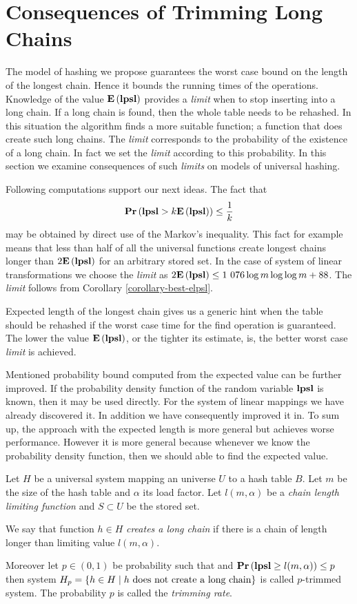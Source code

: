 \section{Consequences of Trimming Long Chains}
The model of hashing we propose guarantees the worst case bound on the length of the longest chain. Hence it bounds the running times of the operations. Knowledge of the value $\mathbf{E}\left(\mathbf{lpsl}\right)$ provides a \emph{limit} when to stop inserting into a long chain. If a long chain is found, then the whole table needs to be rehashed. In this situation the algorithm finds a more suitable function; a function that does create such long chains. The \emph{limit} corresponds to the probability of the existence of a long chain. In fact we set the \emph{limit} according to this probability. In this section we examine consequences of such \emph{limits} on models of universal hashing.

Following computations support our next ideas. The fact that \[ \mathbf{Pr}\left(\mathbf{lpsl} > k \mathbf{E}\left(\mathbf{lpsl}\right)\right) \leq \frac{1}{k} \] may be obtained by direct use of the Markov's inequality. This fact for example means that less than half of all the universal functions create longest chains longer than $2 \mathbf{E}\left(\mathbf{lpsl}\right)$ for an arbitrary stored set. In the case of system of linear transformations we choose the \emph{limit} as $2\mathbf{E}\left(\mathbf{lpsl}\right) \leq \text{1 076} \log m \log \log m + 88$. The \emph{limit} follows from Corollary \ref{corollary-best-elpsl}.

Expected length of the longest chain gives us a generic hint when the table should be rehashed if the worst case time for the find operation is guaranteed. The lower the value $\mathbf{E}\left(\mathbf{lpsl}\right)$, or the tighter its estimate, is, the better worst case \emph{limit} is achieved.

Mentioned probability bound computed from the expected value can be further improved. If the probability density function of the random variable $\mathbf{lpsl}$ is known, then it may be used directly. For the system of linear mappings we have already discovered it. In addition we have consequently improved it in. To sum up, the approach with the expected length is more general but achieves worse performance. However it is more general because whenever we know the probability density function, then we should able to find the expected value.

\begin{definition}
Let $H$ be a universal system mapping an universe $U$ to a hash table $B$. Let $m$ be the size of the hash table and $\alpha$ its load factor. Let $l(m, \alpha)$ be a \emph{chain length limiting function} and $S \subset U$ be the stored set. 

We say that function $h \in H$ \emph{creates a long chain} if there is a chain of length longer than limiting value $l(m, \alpha)$.

Moreover let $p \in (0, 1)$ be probability such that and $\mathbf{Pr}\left(\mathbf{lpsl} \geq l(m, \alpha)\right) \leq p$ then system $H_p = \{ h \in H \mid h \text{ does not create a long chain} \}$ is called $p$-trimmed system. The probability $p$ is called the \emph{trimming rate}.
\end{definition}

